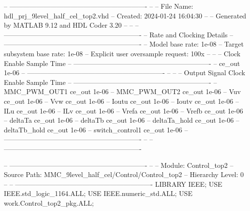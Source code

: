 
\begin{mylisting}[language=VHDL,caption=MSSRDCDB制御\&SVPWMモジュール,label=appF_Control_top2_module_VHDL]

-- -------------------------------------------------------------
-- 
-- File Name: hdl_prj\hdlsrc\MMC_9level_half_cel\Control_top2.vhd
-- Created: 2024-01-24 16:04:30
-- 
-- Generated by MATLAB 9.12 and HDL Coder 3.20
-- 
-- 
-- -------------------------------------------------------------
-- Rate and Clocking Details
-- -------------------------------------------------------------
-- Model base rate: 1e-08
-- Target subsystem base rate: 1e-08
-- Explicit user oversample request: 100x
-- 
-- 
-- Clock Enable  Sample Time
-- -------------------------------------------------------------
-- ce_out        1e-06
-- -------------------------------------------------------------
-- 
-- 
-- Output Signal                 Clock Enable  Sample Time
-- -------------------------------------------------------------
-- MMC_PWM_OUT1                  ce_out        1e-06
-- MMC_PWM_OUT2                  ce_out        1e-06
-- Vuv                           ce_out        1e-06
-- Vvw                           ce_out        1e-06
-- Ioutu                         ce_out        1e-06
-- Ioutv                         ce_out        1e-06
-- ILu                           ce_out        1e-06
-- ILv                           ce_out        1e-06
-- Vrefa                         ce_out        1e-06
-- Vrefb                         ce_out        1e-06
-- deltaTa                       ce_out        1e-06
-- deltaTb                       ce_out        1e-06
-- deltaTa_hold                  ce_out        1e-06
-- deltaTb_hold                  ce_out        1e-06
-- switch_control1               ce_out        1e-06
-- -------------------------------------------------------------
-- 
-- -------------------------------------------------------------


-- -------------------------------------------------------------
-- 
-- Module: Control_top2
-- Source Path: MMC_9level_half_cel/Control/Control_top2
-- Hierarchy Level: 0
-- 
-- -------------------------------------------------------------
LIBRARY IEEE;
USE IEEE.std_logic_1164.ALL;
USE IEEE.numeric_std.ALL;
USE work.Control_top2_pkg.ALL;


\end{mylisting}
